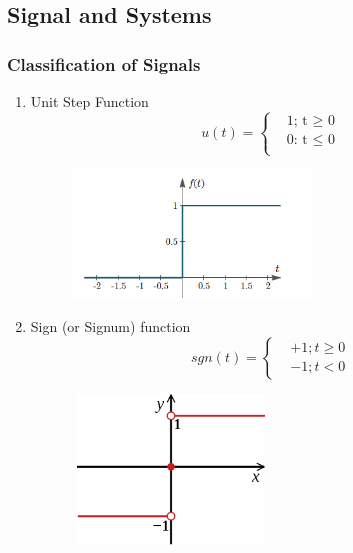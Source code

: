 \subsection{Signal and Systems}
\subsubsection{Classification of Signals}   
\begin{enumerate}
    \item Unit Step Function
    \begin{equation}
    u(t) = 
        \begin{cases}
             & \text{1; t $\geq$ 0}\\
             & \text{0: t $\leq$ 0}\\
        \end{cases}
    \end{equation}
    \begin{figure}[h]
        \centering
        \includegraphics[width=0.6\textwidth]{image/image.png}
        \label{fig:enter-label}
    \end{figure}
    \item Sign (or Signum) function
    \begin{equation}
    sgn(t) = 
        \begin{cases}
            & +1; t \geq 0 \\
            & -1; t < 0
        \end{cases}
    \end{equation}
    \begin{figure}[h]
        \centering
        \includegraphics[width=0.5\textwidth, height=4cm]{image/Signum_function.svg.png}

\end{figure}
\end{enumerate}
